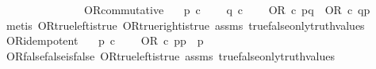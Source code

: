 \begin{isabellebody}
\ \ \ \ \ \ \isamarkupfalse%
\isanewline
\ \ \ \ \isamarkupfalse%
\isanewline
\ \ \isamarkupfalse%
\isanewline
{}\isamarkupfalse%
%
\endisatagproof
{\isafoldproof}%
%
\isadelimproof
\isanewline
%
\endisadelimproof
\isanewline
{}\isamarkupfalse%
\ OR{\isacharunderscore}{\kern0pt}commutative{\isacharcolon}{\kern0pt}\isanewline
\ \ \ {\isachardoublequoteopen}p\ {\isasymin}\isactrlsub c\ {\isasymOmega}{\isachardoublequoteclose}\isanewline
\ \ \ {\isachardoublequoteopen}q\ {\isasymin}\isactrlsub c\ {\isasymOmega}{\isachardoublequoteclose}\isanewline
\ \ \ {\isachardoublequoteopen}OR\ {\isasymcirc}\isactrlsub c\ {\isasymlangle}p{\isacharcomma}{\kern0pt}q{\isasymrangle}\ {\isacharequal}{\kern0pt}\ OR\ {\isasymcirc}\isactrlsub c\ {\isasymlangle}q{\isacharcomma}{\kern0pt}p{\isasymrangle}{\isachardoublequoteclose}\isanewline
%
\isadelimproof
\ \ %
\endisadelimproof
%
\isatagproof
{}\isamarkupfalse%
\ {\isacharparenleft}{\kern0pt}metis\ OR{\isacharunderscore}{\kern0pt}true{\isacharunderscore}{\kern0pt}left{\isacharunderscore}{\kern0pt}is{\isacharunderscore}{\kern0pt}true\ OR{\isacharunderscore}{\kern0pt}true{\isacharunderscore}{\kern0pt}right{\isacharunderscore}{\kern0pt}is{\isacharunderscore}{\kern0pt}true\ assms\ true{\isacharunderscore}{\kern0pt}false{\isacharunderscore}{\kern0pt}only{\isacharunderscore}{\kern0pt}truth{\isacharunderscore}{\kern0pt}values{\isacharparenright}{\kern0pt}%
\endisatagproof
{\isafoldproof}%
%
\isadelimproof
\isanewline
%
\endisadelimproof
\isanewline
{}\isamarkupfalse%
\ OR{\isacharunderscore}{\kern0pt}idempotent{\isacharcolon}{\kern0pt}\isanewline
\ \ \ {\isachardoublequoteopen}p\ {\isasymin}\isactrlsub c\ {\isasymOmega}{\isachardoublequoteclose}\isanewline
\ \ \ {\isachardoublequoteopen}OR\ {\isasymcirc}\isactrlsub c\ {\isasymlangle}p{\isacharcomma}{\kern0pt}p{\isasymrangle}\ {\isacharequal}{\kern0pt}\ p{\isachardoublequoteclose}\isanewline
%
\isadelimproof
\ \ %
\endisadelimproof
%
\isatagproof
{}\isamarkupfalse%
\ OR{\isacharunderscore}{\kern0pt}false{\isacharunderscore}{\kern0pt}false{\isacharunderscore}{\kern0pt}is{\isacharunderscore}{\kern0pt}false\ OR{\isacharunderscore}{\kern0pt}true{\isacharunderscore}{\kern0pt}left{\isacharunderscore}{\kern0pt}is{\isacharunderscore}{\kern0pt}true\ assms\ true{\isacharunderscore}{\kern0pt}false{\isacharunderscore}{\kern0pt}only{\isacharunderscore}{\kern0pt}truth{\isacharunderscore}{\kern0pt}values\ \isamarkupfalse%

\end{isabellebody}
